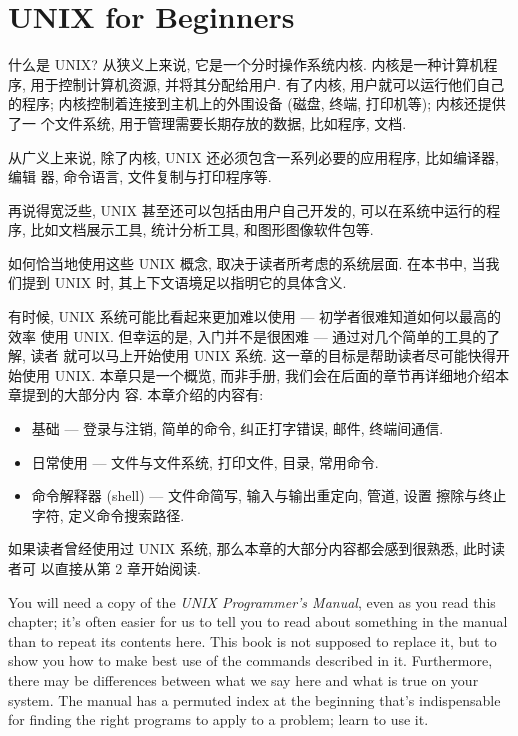 \chapter{UNIX for Beginners}


什么是 UNIX? 从狭义上来说, 它是一个分时操作系统内核. 内核是一种计算机程序,
用于控制计算机资源, 并将其分配给用户. 有了内核, 用户就可以运行他们自己的程序;
内核控制着连接到主机上的外围设备 (磁盘, 终端, 打印机等); 内核还提供了一
个文件系统, 用于管理需要长期存放的数据, 比如程序, 文档.

从广义上来说, 除了内核, UNIX 还必须包含一系列必要的应用程序, 比如编译器, 编辑
器, 命令语言, 文件复制与打印程序等.

再说得宽泛些, UNIX 甚至还可以包括由用户自己开发的, 可以在系统中运行的程序,
比如文档展示工具, 统计分析工具, 和图形图像软件包等.

如何恰当地使用这些 UNIX 概念, 取决于读者所考虑的系统层面. 在本书中, 当我们提到
UNIX 时, 其上下文语境足以指明它的具体含义.

有时候, UNIX 系统可能比看起来更加难以使用 --- 初学者很难知道如何以最高的效率
使用 UNIX. 但幸运的是, 入门并不是很困难 --- 通过对几个简单的工具的了解, 读者
就可以马上开始使用 UNIX 系统. 这一章的目标是帮助读者尽可能快得开始使用 UNIX.
本章只是一个概览, 而非手册, 我们会在后面的章节再详细地介绍本章提到的大部分内
容. 本章介绍的内容有:

\begin{itemize}
    \item 基础 --- 登录与注销, 简单的命令, 纠正打字错误, 邮件, 终端间通信.
    \item 日常使用 --- 文件与文件系统, 打印文件, 目录, 常用命令.
    \item 命令解释器 (shell) --- 文件命简写, 输入与输出重定向, 管道, 设置
        擦除与终止字符, 定义命令搜索路径.
\end{itemize}
  
如果读者曾经使用过 UNIX 系统, 那么本章的大部分内容都会感到很熟悉, 此时读者可
以直接从第 2 章开始阅读.

You will need a copy of the \textit{UNIX Programmer's Manual}, even as you read
this chapter; it's often easier for us to tell you to read about something in
the manual than to repeat its contents here. This book is not supposed to
replace it, but to show you how to make best use of the commands described in
it. Furthermore, there may be differences between what we say here and what is
true on your system. The manual has a permuted index at the beginning that's
indispensable for finding the right programs to apply to a problem; learn to use
it.

